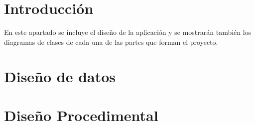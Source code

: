 \section{Introducción}\label{introduccion-diseño}
En este apartado se incluye el diseño de la aplicación y se mostrarán también los diagramas de clases de cada una de las partes que forman el proyecto.

\section{Diseño de datos}\label{ddatos}

\section{Diseño Procedimental}\label{dprocedimental}




